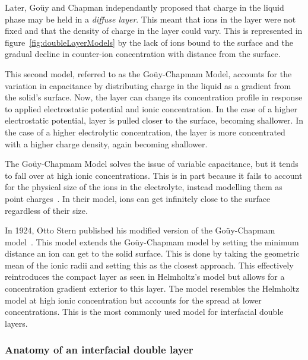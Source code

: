     Later, Goüy and Chapman independantly proposed that charge in the liquid phase may be held in a \emph{diffuse layer}.
    This meant that ions in the layer were not fixed and that the density of charge in the layer could vary.
    This is represented in figure~\ref{fig:doubleLayerModels} by the lack of ions bound to the surface and the gradual decline in counter-ion concentration with distance from the surface.

    This second model, referred to as the Goüy-Chapmam Model, accounts for the variation in capacitance by distributing charge in the liquid as a gradient from the solid's surface.
    Now, the layer can change its concentration profile in response to applied electrostatic potential and ionic concentration.
    In the case of a higher electrostatic potential, layer is pulled closer to the surface, becoming shallower.
    In the case of a higher electrolytic concentration, the layer is more concentrated with a higher charge density, again becoming shallower.

    The Goüy-Chapmam Model solves the issue of variable capacitance, but it tends to fall over at high ionic concentrations.
    This is in part because it fails to account for the physical size of the ions in the electrolyte, instead modelling them as point charges~\cite{Bard1980}.
    In their model, ions can get infinitely close to the surface regardless of their size.

    In 1924, Otto Stern published his modified version of the Goüy-Chapmam model~\cite{Stern1924}.
    This model extends the Goüy-Chapmam model by setting the minimum distance an ion can get to the solid surface.
    This is done by taking the geometric mean of the ionic radii and setting this as the closest approach.
    This effectively reintroduces the compact layer as seen in Helmholtz's model but allows for a concentration gradient exterior to this layer.
    The model resembles the Helmholtz model at high ionic concentration but accounts for the spread at lower concentrations.
    This is the most commonly used model for interfacial double layers.





  
  \subsubsection*{Anatomy of an interfacial double layer}


